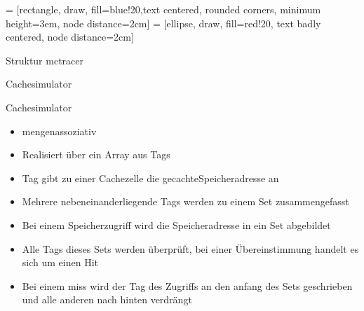 
 = [rectangle, draw, fill=blue!20,text centered, rounded corners, minimum height=3em, node distance=2cm]
 = [ellipse,   draw, fill=red!20, text badly centered, node distance=2cm]

\begin{frame}{Struktur mctracer}
\end{frame}

\begin{frame}{Cachesimulator}
	\begin{block}{Cachesimulator}
		\begin{itemize}[<+->]
			\item mengenassoziativ
			\item Realisiert über ein Array aus Tags
			\item Tag gibt zu einer Cachezelle die gecachteSpeicheradresse an
			\item Mehrere nebeneinanderliegende Tags werden zu einem Set zusammengefasst
			\item Bei einem Speicherzugriff wird die Speicheradresse in ein Set abgebildet
			\item Alle Tags dieses Sets werden überprüft, bei einer Übereinstimmung handelt es sich um einen Hit
			\item Bei einem miss wird der Tag des Zugriffs an den anfang des Sets geschrieben und alle anderen nach hinten verdrängt
		\end{itemize}
	\end{block}
\end{frame}

